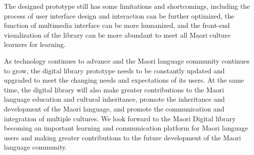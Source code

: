 The designed prototype still has some limitations and shortcomings, including the process of user interface design and interaction can be further optimized, the function of multimedia interface can be more humanized, and the front-end visualization of the library can be more abundant to meet all Maori culture learners for learning.

As technology continues to advance and the Maori language community continues to grow, the digital library prototype needs to be constantly updated and upgraded to meet the changing needs and expectations of its users. At the same time, the digital library will also make greater contributions to the Maori language education and cultural inheritance, promote the inheritance and development of the Maori language, and promote the communication and integration of multiple cultures. We look forward to the Maori Digital library becoming an important learning and communication platform for Maori language users and making greater contributions to the future development of the Maori language community\cite{MaoriCul16:online}.
